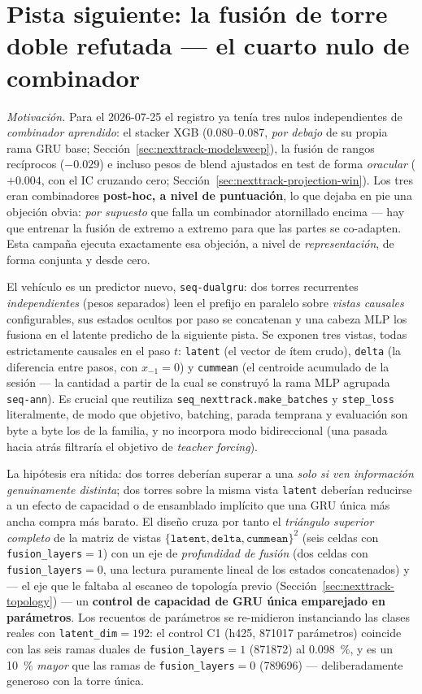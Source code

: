 \documentclass[11pt]{article}
\begin{document}
\section{Pista siguiente: la fusión de torre doble refutada --- el cuarto nulo de combinador}
\label{sec:nexttrack-dualtower}
\emph{Motivación.} Para el 2026-07-25 el registro ya tenía tres nulos
independientes de \emph{combinador aprendido}: el stacker XGB
(\numrange{0.080}{0.087}, \emph{por debajo} de su propia rama GRU base;
Sección~\ref{sec:nexttrack-modelsweep}), la fusión de rangos recíprocos ($-\num{0.029}$) e
incluso pesos de blend ajustados en test de forma \emph{oracular}
($+\num{0.004}$, con el IC cruzando cero; Sección~\ref{sec:nexttrack-projection-win}). Los
tres eran combinadores \textbf{post-hoc, a nivel de puntuación}, lo que dejaba en
pie una objeción obvia: \emph{por supuesto} que falla un combinador atornillado
encima --- hay que entrenar la fusión de extremo a extremo para que las partes se
co-adapten. Esta campaña ejecuta exactamente esa objeción, a nivel de
\emph{representación}, de forma conjunta y desde cero.

El vehículo es un predictor nuevo, \texttt{seq-dualgru}: dos torres recurrentes
\emph{independientes} (pesos separados) leen el prefijo en paralelo sobre
\emph{vistas causales} configurables, sus estados ocultos por paso se concatenan
y una cabeza MLP los fusiona en el latente predicho de la siguiente pista. Se
exponen tres vistas, todas estrictamente causales en el paso $t$:
\texttt{latent} (el vector de ítem crudo), \texttt{delta} (la diferencia entre
pasos, con $x_{-1}=0$) y \texttt{cummean} (el centroide acumulado de la sesión
--- la cantidad a partir de la cual se construyó la rama MLP agrupada
\texttt{seq-ann}). Es crucial que reutiliza \texttt{seq\_nexttrack.make\_batches}
y \texttt{step\_loss} literalmente, de modo que objetivo, batching, parada
temprana y evaluación son byte a byte los de la familia, y no incorpora modo
bidireccional (una pasada hacia atrás filtraría el objetivo de
\emph{teacher forcing}).

La hipótesis era nítida: dos torres deberían superar a una \emph{solo si ven
información genuinamente distinta}; dos torres sobre la misma vista
\texttt{latent} deberían reducirse a un efecto de capacidad o de ensamblado
implícito que una GRU única más ancha compra más barato. El diseño cruza por
tanto el \emph{triángulo superior completo} de la matriz de vistas
$\{\texttt{latent},\texttt{delta},\texttt{cummean}\}^2$ (seis celdas con
\texttt{fusion\_layers}${}=1$) con un eje de \emph{profundidad de fusión} (dos
celdas con \texttt{fusion\_layers}${}=0$, una lectura puramente lineal de los
estados concatenados) y --- el eje que le faltaba al escaneo de topología previo
(Sección~\ref{sec:nexttrack-topology}) --- un \textbf{control de capacidad de GRU única
emparejado en parámetros}. Los recuentos de parámetros se re-midieron
instanciando las clases reales con \texttt{latent\_dim}${}=192$: el control C1
(h425, \num{871017} parámetros) coincide con las seis ramas duales de
\texttt{fusion\_layers}${}=1$ (\num{871872}) al \SI{0.098}{\percent}, y es un
\SI{10}{\percent} \emph{mayor} que las ramas de \texttt{fusion\_layers}${}=0$
(\num{789696}) --- deliberadamente generoso con la torre única.
\end{document}
